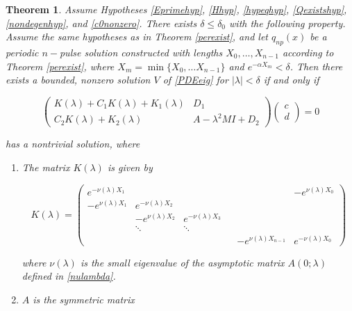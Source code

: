 \documentclass[12pt]{article}
\newtheorem{theorem}{Theorem}
\begin{document}
\begin{theorem}\label{blockmatrixtheorem}
Assume Hypotheses \ref{Eprimehyp}, \ref{Hhyp}, \ref{hypeqhyp}, \ref{Qexistshyp}, \ref{nondegenhyp}, and \ref{c0nonzero}. There exists $\delta \leq \delta_0$ with the following property. Assume the same hypotheses as in Theorem \ref{perexist}, and let $q_{np}(x)$ be a periodic $n-$pulse solution constructed with lengths $X_0, \dots, X_{n-1}$ according to Theorem \ref{perexist}, where $X_m = \min\{ X_0, \dots X_{n-1}\}$ and $e^{-\alpha X_m} < \delta$. Then there exists a bounded, nonzero solution $V$ of \eqref{PDEeig} for $|\lambda| < \delta$ if and only if 

\begin{equation}\label{blockeq}
\begin{pmatrix}
K(\lambda) + C_1 K(\lambda) + K_1(\lambda) & D_1 \\
C_2 K(\lambda) + K_2(\lambda) & A - \lambda^2 MI + D_2
\end{pmatrix}
\begin{pmatrix} c \\ d \end{pmatrix} = 0
\end{equation}

has a nontrivial solution, where 

\begin{enumerate}

\item The matrix $K(\lambda)$ is given by

\begin{equation}
K(\lambda) = 
\begin{pmatrix}
e^{-\nu(\lambda)X_1} & & & & & -e^{\nu(\lambda)X_0} \\
-e^{\nu(\lambda)X_1} & e^{-\nu(\lambda)X_2} \\
& -e^{\nu(\lambda)X_2} & e^{-\nu(\lambda)X_3} \\
& \ddots & \ddots & &&  \\
& & & & -e^{\nu(\lambda)X_{n-1}} & e^{-\nu(\lambda)X_0} 
\end{pmatrix}
\end{equation}

where $\nu(\lambda)$ is the small eigenvalue of the asymptotic matrix $A(0; \lambda)$ defined in \eqref{nulambda}.

\item $A$ is the symmetric matrix


\end{enumerate}
\end{theorem}
\end{document}
